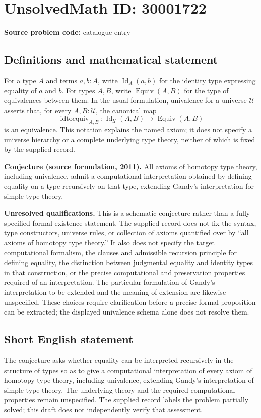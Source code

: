 \documentclass[11pt]{article}
\begin{document}
\section*{UnsolvedMath ID: 30001722}
\textbf{Source problem code:} catalogue entry
\subsection{Definitions and mathematical statement}
For a type \(A\) and terms \(a,b:A\), write \(\operatorname{Id}_A(a,b)\) for the identity type expressing equality of \(a\) and \(b\). For types \(A,B\), write \(\operatorname{Equiv}(A,B)\) for the type of equivalences between them. In the usual formulation, univalence for a universe \(\mathcal U\) asserts that, for every \(A,B:\mathcal U\), the canonical map
\[
\operatorname{idtoequiv}_{A,B}:\operatorname{Id}_{\mathcal U}(A,B)\longrightarrow\operatorname{Equiv}(A,B)
\]
is an equivalence. This notation explains the named axiom; it does not specify a universe hierarchy or a complete underlying type theory, neither of which is fixed by the supplied record.

\textbf{Conjecture (source formulation, 2011).} All axioms of homotopy type theory, including univalence, admit a computational interpretation obtained by defining equality on a type recursively on that type, extending Gandy's interpretation for simple type theory.

\textbf{Unresolved qualifications.} This is a schematic conjecture rather than a fully specified formal existence statement. The supplied record does not fix the syntax, type constructors, universe rules, or collection of axioms quantified over by ``all axioms of homotopy type theory.'' It also does not specify the target computational formalism, the clauses and admissible recursion principle for defining equality, the distinction between judgmental equality and identity types in that construction, or the precise computational and preservation properties required of an interpretation. The particular formulation of Gandy's interpretation to be extended and the meaning of extension are likewise unspecified. These choices require clarification before a precise formal proposition can be extracted; the displayed univalence schema alone does not resolve them.
\subsection{Short English statement}
The conjecture asks whether equality can be interpreted recursively in the structure of types so as to give a computational interpretation of every axiom of homotopy type theory, including univalence, extending Gandy's interpretation of simple type theory. The underlying theory and the required computational properties remain unspecified. The supplied record labels the problem partially solved; this draft does not independently verify that assessment.
\end{document}
